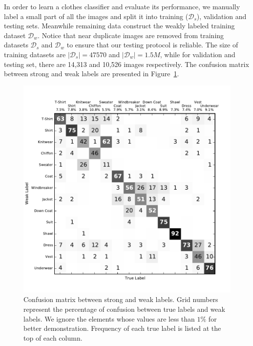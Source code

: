\documentclass[10pt,twocolumn,letterpaper]{article}
\begin{document}
In order to learn a clothes classifier and evaluate its performance, we manually label a small part of all the images and split it into training ($\mathcal{D}_s$), validation and testing sets. Meanwhile remaining data construct the weakly labeled training dataset $\mathcal{D}_w$. Notice that near duplicate images are removed from training datasets $\mathcal{D}_s$ and $\mathcal{D}_w$ to ensure that our testing protocol is reliable. The size of training datasets are $|\mathcal{D}_s| = 47570$ and $|\mathcal{D}_w| = 1.5M$, while for validation and testing set, there are 14,313 and 10,526 images respectively. The confusion matrix between strong and weak labels are presented in Figure~\ref{fig:cm_strong_weak}.

\begin{figure}[t]
\begin{center}
\includegraphics[width=1.0\linewidth]{figure/cm_strong_weak_labels.pdf}
\end{center}
\caption{Confusion matrix between strong and weak labels. Grid numbers represent the percentage of confusion between true labels and weak labels. We ignore the elements whose values are less than $1\%$ for better demonstration. Frequency of each true label is listed at the top of each column.}
\label{fig:cm_strong_weak}
\end{figure}
\end{document}
